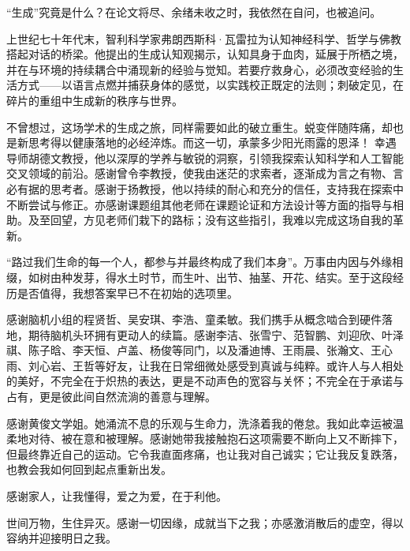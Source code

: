 \begin{ack}

“生成”究竟是什么？在论文将尽、余绪未收之时，我依然在自问，也被追问。

上世纪七十年代末，智利科学家弗朗西斯科·瓦雷拉为认知神经科学、哲学与佛教搭起对话的桥梁。他提出的生成认知观揭示，认知具身于血肉，延展于所栖之境，并在与环境的持续耦合中涌现新的经验与觉知。若要疗救身心，必须改变经验的生活方式——以语言点燃并捕获身体的感觉，以实践校正既定的法则；刺破定见，在碎片的重组中生成新的秩序与世界。

不曾想过，这场学术的生成之旅，同样需要如此的破立重生。蜕变伴随阵痛，却也是新思考得以健康落地的必经淬炼。而这一切，承蒙多少阳光雨露的恩泽！
幸遇导师胡德文教授，他以深厚的学养与敏锐的洞察，引领我探索认知科学和人工智能交叉领域的前沿。感谢曾令李教授，使我由迷茫的求索者，逐渐成为言之有物、言必有据的思考者。感谢于扬教授，他以持续的耐心和充分的信任，支持我在探索中不断尝试与修正。亦感谢课题组其他老师在课题论证和方法设计等方面的指导与相助。及至回望，方见老师们栽下的路标；没有这些指引，我难以完成这场自我的革新。

“路过我们生命的每一个人，都参与并最终构成了我们本身”。万事由内因与外缘相缀，如树由种发芽，得水土时节，而生叶、出节、抽茎、开花、结实。至于这段经历是否值得，我想答案早已不在初始的选项里。

感谢脑机小组的程贤哲、吴安琪、李浩、童柔敏。我们携手从概念啮合到硬件落地，期待脑机头环拥有更动人的续篇。感谢李洁、张雪宁、范智鹏、刘迎欣、叶泽祺、陈子晗、李天恒、卢盖、杨俊等同门，以及潘迪博、王雨晨、张瀚文、王心雨、刘心岩、王哲等好友，让我在日常细微处感受到真诚与纯粹。或许人与人相处的美好，不完全在于炽热的表达，更是不动声色的宽容与关怀；不完全在于承诺与占有，更是彼此间自然流淌的善意与理解。

感谢黄俊文学姐。她涌流不息的乐观与生命力，洗涤着我的倦怠。我如此幸运被温柔地对待、被在意和被理解。感谢她带我接触抱石这项需要不断向上又不断摔下，但最终靠近自己的运动。它令我直面疼痛，也让我对自己诚实；它让我反复跌落，也教会我如何回到起点重新出发。

感谢家人，让我懂得，爱之为爱，在于利他。

世间万物，生住异灭。感谢一切因缘，成就当下之我；亦感激消散后的虚空，得以容纳并迎接明日之我。

\end{ack}